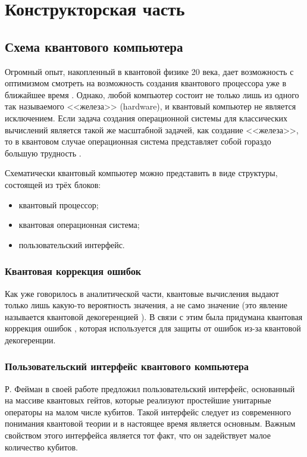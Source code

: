 \chapter{Конструкторская часть}

\section{Схема квантового компьютера}

Огромный опыт, накопленный в квантовой физике 20 века, дает возможность с оптимизмом смотреть на возможность создания квантового процессора уже в ближайшее время \cite{quantum-computer}. Однако, любой компьютер состоит не только лишь из одного так называемого <<железа>> (hardware), и квантовый компьютер не является исключением. Если задача создания операционной системы для классических вычислений является такой же масштабной задачей, как создание <<железа>>, то в квантовом случае операционная система представляет собой гораздо большую трудность \cite{quantum-computer}.

Схематически квантовый компьютер можно представить в виде структуры, состоящей из трёх блоков:

\begin{itemize}
	\item квантовый процессор;
	\item квантовая операционная система;
	\item пользовательский интерфейс.
\end{itemize}

\subsection{Квантовая коррекция ошибок}
Как уже говорилось в аналитической части, квантовые вычисления выдают только лишь какую-то вероятность значения, а не само значение (это явление называется квантовой декогеренцией \cite{decog}). В связи с этим была придумана квантовая коррекция ошибок \cite{quantum-codes}, которая используется для защиты от ошибок из-за квантовой декогеренции.

\subsection{Пользовательский интерфейс квантового компьютера}

Р. Фейман в своей работе \cite{feynman} предложил пользовательский интерфейс, основанный на массиве квантовых гейтов, которые реализуют простейшие унитарные операторы на малом числе кубитов. Такой интерфейс следует из современного понимания квантовой теории \cite{quantum-computer} и в настоящее время является основным. Важным свойством этого интерфейса является тот факт, что он задействует малое количество кубитов.

